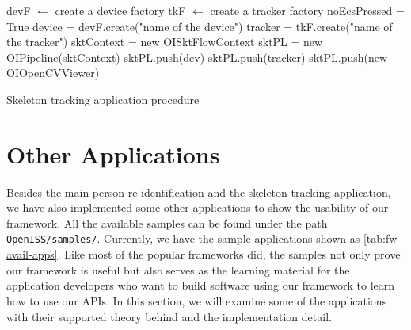 \begin{algorithm}
    devF $\leftarrow$ create a device factory\;
    tkF $\leftarrow$ create a tracker factory\;
    \;
    noEcsPressed = True\;
    device = devF.create("name of the device")\;
    tracker = tkF.create("name of the tracker")\;
    \;
    sktContext = new OISktFlowContext \;
    sktPL = new OIPipeline(sktContext) \;
    sktPL.push(dev)\;
    sktPL.push(tracker)\;
    sktPL.push(new OIOpenCVViewer)\;
    \;
    \caption{Skeleton tracking application procedure}
    \label{algo:fw-app-skt}
\end{algorithm}



\section{Other Applications}
\label{sec:Impl-fw-app-other}

Besides the main person re-identification and the skeleton tracking 
application, we have also implemented
some other applications to show the usability of our framework. All the
available samples can be found under the path \texttt{OpenISS/samples/}.
Currently, we have the sample applications shown as \autoref{tab:fw-avail-apps}.
Like most of the popular frameworks did, the samples not only prove our
framework is useful but also serves as the learning material for the 
application developers who want to build software using our framework to learn 
how to use our APIs.
In this section, we will examine some of the applications with their
supported theory behind and the implementation detail.

